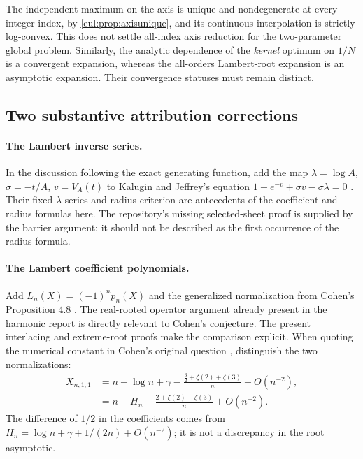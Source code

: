 \documentclass[11pt]{article}
\numberwithin{equation}{section}
\theoremstyle{definition}
\theoremstyle{remark}
\begin{document}
The independent maximum on the axis is unique and nondegenerate at
every integer index, by \cref{eul:prop:axisunique}, and its continuous
interpolation is strictly log-convex. This does not settle all-index
axis reduction for the two-parameter global problem. Similarly, the
analytic dependence of the \emph{kernel} optimum on $1/N$ is a
convergent expansion, whereas the all-orders Lambert-root expansion is
an asymptotic expansion. Their convergence statuses must remain distinct.

\subsection{Two substantive attribution corrections}

\paragraph{The Lambert inverse series.}
In the discussion following the exact generating function, add the
map $\lambda=\log A$, $\sigma=-t/A$, $v=V_A(t)$ to
Kalugin and Jeffrey's equation
$1-e^{-v}+\sigma v-\sigma\lambda=0$
\cite{KaluginJeffrey2012}. Their fixed-$\lambda$ series and radius
criterion are antecedents of the coefficient and radius formulas here.
The repository's missing selected-sheet proof is supplied by the
barrier argument; it should not be described as the first occurrence
of the radius formula.

\paragraph{The Lambert coefficient polynomials.}
Add $L_n(X)=(-1)^np_n(X)$ and the generalized normalization from
Cohen's Proposition 4.8 \cite{Cohen2021}. The real-rooted operator
argument already present in the harmonic report is directly relevant
to Cohen's conjecture. The present interlacing and extreme-root proofs
make the comparison explicit. When quoting the numerical constant in
Cohen's original question \cite{CohenMO2020}, distinguish the two
normalizations:
\begin{align*}
 X_{n,1,1}
 &=n+\log n+\gamma
       -\frac{\frac32+\zeta(2)+\zeta(3)}n+O(n^{-2}),\\
 &=n+H_n
       -\frac{2+\zeta(2)+\zeta(3)}n+O(n^{-2}).
\end{align*}
The difference of $1/2$ in the coefficients comes from
$H_n=\log n+\gamma+1/(2n)+O(n^{-2})$; it is not a discrepancy in
the root asymptotic.
\end{document}
